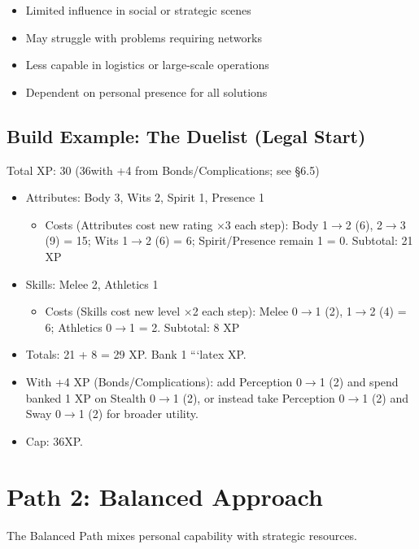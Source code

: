 \documentclass[11pt,twoside,openany]{book}
\begin{document}
\begin{itemize}
\item Limited influence in social or strategic scenes
\item May struggle with problems requiring networks
\item Less capable in logistics or large-scale operations
\item Dependent on personal presence for all solutions
\end{itemize}

\subsection*{Build Example: The Duelist (Legal Start)}

Total XP: 30 (36with +4 from Bonds/Complications; see §6.5)

\begin{itemize}
\item Attributes: Body 3, Wits 2, Spirit 1, Presence 1
\begin{itemize}
\item Costs (Attributes cost new rating ×3 each step): Body 1$\rightarrow$2 (6), 2$\rightarrow$3 (9) = 15; Wits 1$\rightarrow$2 (6) = 6; Spirit/Presence remain 1 = 0. Subtotal: 21 XP
\end{itemize}
\item Skills: Melee 2, Athletics 1
\begin{itemize}
\item Costs (Skills cost new level ×2 each step): Melee 0$\rightarrow$1 (2), 1$\rightarrow$2 (4) = 6; Athletics 0$\rightarrow$1 = 2. Subtotal: 8 XP
\end{itemize}
\item Totals: 21 + 8 = 29 XP. Bank 1
```latex
 XP.
\item With +4 XP (Bonds/Complications): add Perception 0$\rightarrow$1 (2) and spend banked 1 XP on Stealth 0$\rightarrow$1 (2), or instead take Perception 0$\rightarrow$1 (2) and Sway 0$\rightarrow$1 (2) for broader utility.
\item Cap: 36XP.
\end{itemize}

\section*{Path 2: Balanced Approach} 

The Balanced Path mixes personal capability with strategic resources.
\end{document}
